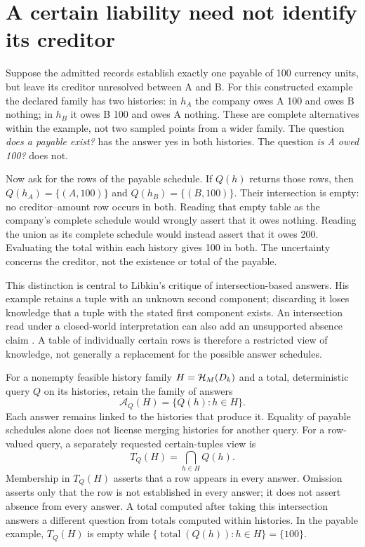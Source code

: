 \section{A certain liability need not identify its creditor}
\label{sec:query-certainty}

Suppose the admitted records establish exactly one payable of 100 currency
units, but leave its creditor unresolved between A and B. For this constructed
example the declared family has two histories: in $h_A$ the company owes A
100 and owes B nothing; in $h_B$ it owes B 100 and owes A nothing. These are
complete alternatives within the example, not two sampled points from a wider
family. The question \emph{does a payable exist?} has the answer yes in both
histories. The question \emph{is A owed 100?} does not.

Now ask for the rows of the payable schedule. If $Q(h)$ returns those rows,
then $Q(h_A)=\{(A,100)\}$ and $Q(h_B)=\{(B,100)\}$. Their intersection is
empty: no creditor--amount row occurs in both. Reading that empty table as
the company's complete schedule would wrongly assert that it owes nothing.
Reading the union as its complete schedule would instead assert that it owes
200. Evaluating the total within each history gives 100 in both. The
uncertainty concerns the creditor, not the existence or total of the payable.

This distinction is central to Libkin's critique of intersection-based
answers. His example retains a tuple with an unknown second component;
discarding it loses knowledge that a tuple with the stated first component
exists. An intersection read under a closed-world interpretation can also
add an unsupported absence claim \citep[Section~3 and the opening of
Section~6]{libkin2014}. A table of individually certain rows is therefore a
restricted view of knowledge, not generally a replacement for the possible
answer schedules.

For a nonempty feasible history family $H=\mathcal{H}_M(D_k)$ and a total,
deterministic query $Q$ on its histories, retain the family of answers
\[
 \mathcal{A}_Q(H)=\{Q(h):h\in H\}.
\]
Each answer remains linked to the histories that produce it. Equality of
payable schedules alone does not license merging histories for another query.
For a row-valued query, a separately requested certain-tuples view is
\[
 T_Q(H)=\bigcap_{h\in H}Q(h).
\]
Membership in $T_Q(H)$ asserts that a row appears in every answer. Omission
asserts only that the row is not established in every answer; it does not
assert absence from every answer. A total computed after taking this
intersection answers a different question from totals computed within
histories. In the payable example, $T_Q(H)$ is empty while
$\{\operatorname{total}(Q(h)):h\in H\}=\{100\}$.

